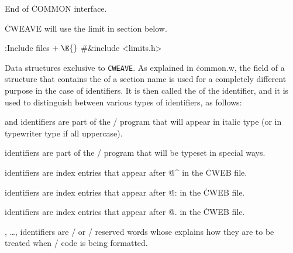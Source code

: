 End of \.{COMMON} interface.

\fi

\.{CWEAVE} will use the  limit in section
 below.

\Y\B\4:Include files\X${}\mathrel+\E{}$\6
\8\#\&{include} \.{<limits.h>}\par
\fi

Data structures exclusive to {\tt CWEAVE}.
As explained in \.{common.w}, the field of a  structure
that contains the  of a section name is used for a completely
different purpose in the case of identifiers.  It is then called the
 of the identifier, and it is used to
distinguish between various types of identifiers, as follows:

\yskip\hang {} and  identifiers are part of
the
\CEE/ program that will  appear in italic type (or in typewriter type
if all uppercase).

\yskip\hang {} identifiers are part of the \CEE/ program that
will be typeset in special ways.

\yskip\hang {} identifiers are index entries that appear after
\.{@\^} in the \.{CWEB} file.

\yskip\hang {} identifiers are index entries that appear after
\.{@:} in the \.{CWEB} file.

\yskip\hang {} identifiers are index entries that appear after
\.{@.} in the \.{CWEB} file.

\yskip\hang {}, \dots, 
identifiers are \CEE/ or \CPLUSPLUS/ reserved words whose 
explains how they are to be treated when \CEE/ code is being
formatted.

